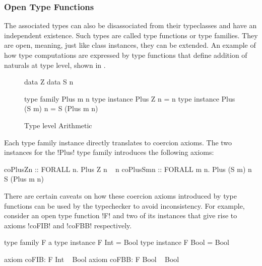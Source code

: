 \documentclass[screen,nonacm,manuscript,review]{acmart} %
\begin{document}
\subsubsection{Open Type Functions}\label{sec:fc-encodes-opentypefun}
The associated types can also be disassociated from their typeclasses
and have an independent existence. Such types are called type functions or type families.
They are open, meaning, just like class instances, they can be extended. An
example of how type computations are expressed by type functions that
define addition of naturals at type level, shown in .
\begin{figure}[ht]
\begin{minipage}[ht]{0.4\linewidth}
\begin{code}
data Z
data S n
\end{code}
\end{minipage}%
\begin{minipage}[ht]{0.4\linewidth}
\begin{code}
type family Plus m n
type instance Plus Z n = n
type instance Plus (S m) n = S (Plus m n)
\end{code}
\end{minipage}
\caption{Type level Arithmetic}
\label{fig:open-type-fun-add}
\end{figure}

Each type family instance directly translates to coercion axioms.
The two instances for the !Plus! type family introduces the following axioms:

\begin{CenteredBox}
\begin{code}
coPlusZn :: FORALL n. Plus Z n ~ n
coPlusSmn :: FORALL m n. Plus (S m) n ~ S (Plus m n)
\end{code}
\end{CenteredBox}

There are certain caveats on how these coercion axioms introduced by
type functions can be used by the typechecker to avoid inconsistency.
For example, consider an open type function !F! and two
of its instances that give rise to axioms !coFIB! and !coFBB! respectively.

\begin{minipage}[ht]{0.5\linewidth}
\begin{code}
            type family F a
            type instance F Int = Bool
            type instance F Bool = Bool
\end{code}
\end{minipage}%
\begin{minipage}[ht]{0.5\linewidth}
\begin{code}
      axiom coFIB: F Int ~ Bool
      axiom coFBB: F Bool ~ Bool
\end{code}
\end{minipage}
\end{document}
